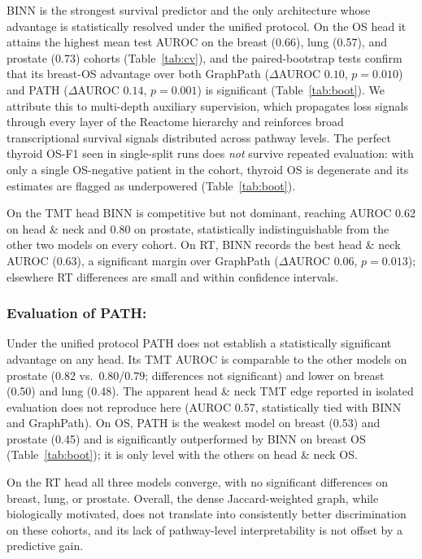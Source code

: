 \documentclass[sigconf]{acmart}
\begin{document}
BINN is the strongest survival predictor and the only architecture whose
advantage is statistically resolved under the unified protocol. On the OS
head it attains the highest mean test AUROC on the breast (0.66), lung
(0.57), and prostate (0.73) cohorts (Table~\ref{tab:cv}), and the
paired-bootstrap tests confirm that its breast-OS advantage over both
GraphPath ($\Delta$AUROC $0.10$, $p{=}0.010$) and PATH ($\Delta$AUROC
$0.14$, $p{=}0.001$) is significant (Table~\ref{tab:boot}). We attribute
this to multi-depth auxiliary supervision, which propagates loss signals
through every layer of the Reactome hierarchy and reinforces broad
transcriptional survival signals distributed across pathway levels. The
perfect thyroid OS-F1 seen in single-split runs does \emph{not} survive
repeated evaluation: with only a single OS-negative patient in the cohort,
thyroid OS is degenerate and its estimates are flagged as underpowered
(Table~\ref{tab:boot}).

On the TMT head BINN is competitive but not dominant, reaching AUROC 0.62
on head \& neck and 0.80 on prostate, statistically indistinguishable from
the other two models on every cohort. On RT, BINN records the best head \&
neck AUROC (0.63), a significant margin over GraphPath ($\Delta$AUROC
$0.06$, $p{=}0.013$); elsewhere RT differences are small and within
confidence intervals.

\subsubsection{Evaluation of PATH:}
Under the unified protocol PATH does not establish a statistically
significant advantage on any head. Its TMT AUROC is comparable to the other
models on prostate ($0.82$ vs.\ $0.80$/$0.79$; differences not significant)
and lower on breast (0.50) and lung (0.48). The apparent head \& neck TMT
edge reported in isolated evaluation does not reproduce here (AUROC 0.57,
statistically tied with BINN and GraphPath). On OS, PATH is the weakest
model on breast (0.53) and prostate (0.45) and is significantly
outperformed by BINN on breast OS (Table~\ref{tab:boot}); it is only level
with the others on head \& neck OS.

On the RT head all three models converge, with no significant differences
on breast, lung, or prostate. Overall, the dense Jaccard-weighted graph,
while biologically motivated, does not translate into consistently better
discrimination on these cohorts, and its lack of pathway-level
interpretability is not offset by a predictive gain.
\end{document}

